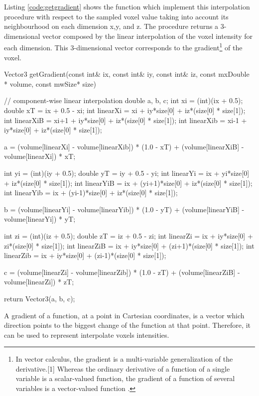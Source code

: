 \documentclass[12pt,a4paper]{extarticle}
\newcommand{\linespace}{\vspace{8pt}}
\begin{document}
Listing \ref{code:getgradient} shows the function which implement this interpolation procedure with respect to the sampled voxel value taking into account its neighbourhood on each dimension x,y, and z. The procedure returns a 3-dimensional vector composed by the linear interpolation of the voxel intensity for each dimension. This 3-dimensional vector corresponds to the gradient\footnote{In vector calculus, the gradient is a multi-variable generalization of the derivative.[1] Whereas the ordinary derivative of a function of a single variable is a scalar-valued function, the gradient of a function of several variables is a vector-valued function \cite{gradient:7}.} of the voxel. 

\begin{cpp}[caption={Component-wise linear interpolation functions computing voxel gradient},label=code:getgradient]
Vector3 getGradient(const int& ix, const int& iy, const int& iz, 
		const mxDouble * volume, const mwSize* size) {
	// component-wise linear interpolation
	double a, b, c;
	int xi = (int)(ix + 0.5);
	double xT = ix + 0.5 - xi;
	int linearXi = xi + iy*size[0] + iz*(size[0] * size[1]);
	int linearXiB = xi+1 + iy*size[0] + iz*(size[0] * size[1]);
	int linearXib = xi-1 + iy*size[0] + iz*(size[0] * size[1]);

	a = (volume[linearXi] - volume[linearXib]) * (1.0 - xT) + 
	(volume[linearXiB] - volume[linearXi]) * xT;
	
	int yi = (int)(iy + 0.5);
	double yT = iy + 0.5 - yi;
	int linearYi = ix + yi*size[0] + iz*(size[0] * size[1]);
	int linearYiB = ix + (yi+1)*size[0] + iz*(size[0] * size[1]);
	int linearYib = ix + (yi-1)*size[0] + iz*(size[0] * size[1]);
	
	b = (volume[linearYi] - volume[linearYib]) * (1.0 - yT) + 
	(volume[linearYiB] - volume[linearYi]) * yT;
	
	int zi = (int)(iz + 0.5);
	double zT = iz + 0.5 - zi;
	int linearZi = ix + iy*size[0] + zi*(size[0] * size[1]);
	int linearZiB = ix + iy*size[0] + (zi+1)*(size[0] * size[1]);
	int linearZib = ix + iy*size[0] + (zi-1)*(size[0] * size[1]);
	
	c = (volume[linearZi] - volume[linearZib]) * (1.0 - zT) + 
	(volume[linearZiB] - volume[linearZi]) * zT;
	
	return Vector3(a, b, c);
}
\end{cpp}

A gradient of a function, at a point in Cartesian coordinates, is a vector which direction points to the biggest change of the function at that point. Therefore, it can be used to represent interpolate voxels intensities.
\linespace
\end{document}
